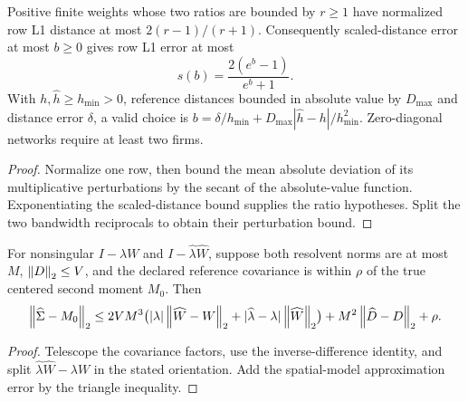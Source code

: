 \begin{theorem}\label{thm:kernel-sharp}
  \leanok
  Positive finite weights whose two ratios are bounded by $r\ge1$ have
  normalized row L1 distance at most $2(r-1)/(r+1)$. Consequently
  scaled-distance
  error at most $b\ge0$ gives row L1 error at most
  \[
    s(b)=\frac{2(e^b-1)}{e^b+1}.
  \]
  With $h,\widehat h\ge h_{\min}>0$, reference distances bounded in absolute
  value by $D_{\max}$ and distance error $\delta$, a valid choice is
  $b=\delta/h_{\min}+D_{\max}|\widehat h-h|/h_{\min}^2$.
  Zero-diagonal networks require at least two firms.
\end{theorem}
\begin{proof}\leanok
  Normalize one row, then bound the mean absolute deviation of its
  multiplicative perturbations by the secant of the absolute-value function.
  Exponentiating the scaled-distance bound supplies the ratio hypotheses.
  Split the two bandwidth reciprocals to obtain their perturbation bound.
\end{proof}

\begin{theorem}\label{thm:stability-joint}
  \leanok
  For nonsingular $I-\lambda W$ and $I-\widehat\lambda\widehat W$, suppose
  both resolvent norms are at most $M$, $\left\lVert D\right\rVert_2\le V$, and the declared
  reference covariance is within $\rho$ of the true centered second moment
  $M_0$. Then
  \[
    \left\lVert\widehat\Sigma-M_0\right\rVert_2
    \le2VM^3\bigl(|\lambda|\left\lVert\widehat W-W\right\rVert_2
    +|\widehat\lambda-\lambda|\left\lVert\widehat W\right\rVert_2\bigr)
    +M^2\left\lVert\widehat D-D\right\rVert_2+\rho.
  \]
\end{theorem}
\begin{proof}\leanok
  Telescope the covariance factors, use the inverse-difference identity,
  and split $\widehat\lambda\widehat W-\lambda W$ in the stated orientation.
  Add the spatial-model approximation error by the triangle inequality.
\end{proof}


